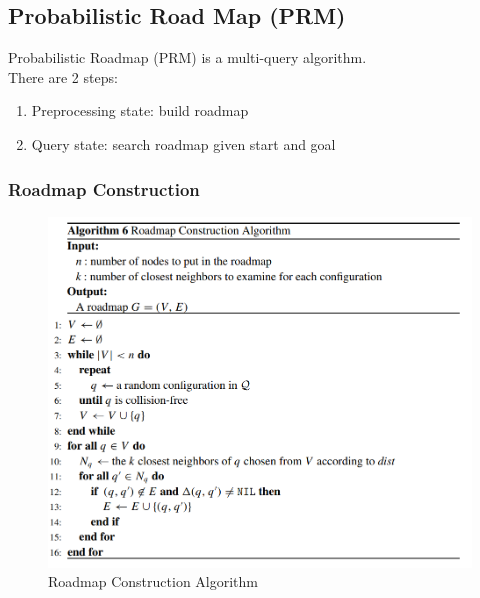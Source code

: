 \documentclass[11pt]{article}
\begin{document}
\subsection{Probabilistic Road Map (PRM)}
Probabilistic Roadmap (PRM) is a multi-query algorithm.\\
There are 2 steps:
\begin{enumerate}
\item Preprocessing state: build roadmap
\item Query state: search roadmap given start and goal
\end{enumerate}

\subsubsection{Roadmap Construction}

\begin{figure}[h]
\includegraphics{PRM}
\centering
\caption{Roadmap Construction Algorithm}
\label{fig:roadmap_alg}
\end{figure}
\end{document}
